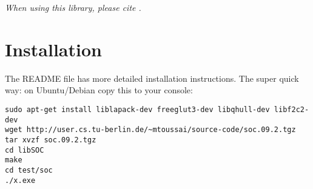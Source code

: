 
\lectureNote
\pdflatex

  \usepackage{listings}

\newcommand{\cmd}[1]{\lstinline$#1$}
\newcommand{\file}[1]{\href{\pwd/../#1}{\nolinkurl{#1}}}
\newcommand{\namespace}[1]{\href{\pwd/html/namespace#1.html}{\nolinkurl{#1}}}
\newcommand{\source}[2]{\href{\pwd/html/#1_8#2-source.html}{\nolinkurl{#1.#2}}}
\newcommand{\struct}[2]{\href{\pwd/html/struct#1_1_1#2.html}{\nolinkurl{#1::#2}}}
\newcommand{\method}[3]{\href{\pwd/html/struct#1_1_1#2.html}{\nolinkurl{#1::#2::#3}}}
\newcommand{\function}[2]{\href{\pwd/html/namespace#1.html}{\nolinkurl{#1::#2}}}




\maketitle

\begin{center}
\emph{When using this library, please
cite \cite{@-toussaint:09-icml}.}
\end{center}

\tableofcontents


\section{Installation}

The README file has more detailed installation instructions. The super
quick way: on Ubuntu/Debian copy this to your console:
\begin{lstlisting}
sudo apt-get install liblapack-dev freeglut3-dev libqhull-dev libf2c2-dev
wget http://user.cs.tu-berlin.de/~mtoussai/source-code/soc.09.2.tgz
tar xvzf soc.09.2.tgz
cd libSOC
make
cd test/soc
./x.exe
\end{lstlisting}

